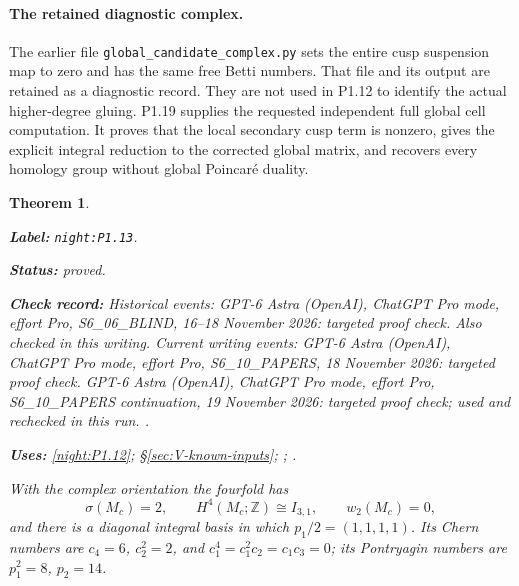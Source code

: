 \documentclass[11pt,a4paper]{article}
\newtheorem{theorem}{Theorem}[section]
\theoremstyle{definition}
\newcommand{\StatementRecord}[4]{\par\smallskip\begingroup\upshape\raggedright\noindent\textbf{Label:} \nolinkurl{#1}.\par\noindent\textbf{Status:} #2.\par\noindent\textbf{Check record:} #3.\par\noindent\textbf{Uses:} #4.\par\endgroup\smallskip}
\begin{document}
\paragraph{The retained diagnostic complex.}
The earlier file \texttt{global\_candidate\_complex.py} sets the entire
cusp suspension map to zero and has the same free Betti numbers.
That file and its output are retained as a diagnostic record.  They
are not used in P1.12 to identify the actual higher-degree gluing.
P1.19 supplies the requested independent full global cell computation.
It proves that the local secondary cusp term is nonzero, gives the
explicit integral reduction to the corrected global matrix, and
recovers every homology group without global Poincar\'e duality.

\begin{theorem}\label{night:P1.13}
\StatementRecord{night:P1.13}{proved}{Historical events: GPT-6 Astra (OpenAI), ChatGPT Pro mode, effort Pro, S6\_06\_BLIND, 16--18 November 2026: targeted proof check. Also checked in this writing. Current writing events: GPT-6 Astra (OpenAI), ChatGPT Pro mode, effort Pro, S6\_10\_PAPERS, 18 November 2026: targeted proof check. GPT-6 Astra (OpenAI), ChatGPT Pro mode, effort Pro, S6\_10\_PAPERS continuation, 19 November 2026: targeted proof check; used and rechecked in this run. }{\cref{night:P1.12}; \S\ref{sec:V-known-inputs}; \cite[equations (1.2)--(1.4), pp.~3--4]{ffEsoleKang}; \cite[Theorem 2.2.1, p.~61]{ffPetersSterk}}
With the complex orientation the fourfold has
\[
\sigma(M_c)=2,\qquad H^4(M_c;\mathbb Z)\cong I_{3,1},\qquad
w_2(M_c)=0,
\]
and there is a diagonal integral basis in which
$p_1/2=(1,1,1,1)$.
Its Chern numbers are
$c_4=6$, $c_2^2=2$, and
$c_1^4=c_1^2c_2=c_1c_3=0$; its Pontryagin numbers are
$p_1^2=8$, $p_2=14$.
\end{theorem}
\end{document}

